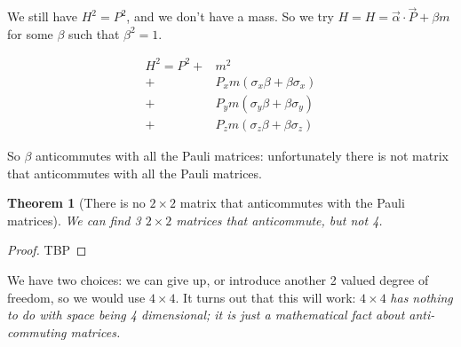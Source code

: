 \documentclass[]{article}
\newtheorem{thm}{Theorem}
\begin{document}
We still have $H^2=P^2$, and we don't have a mass. So we try $H= H = \vec{\alpha} \cdot \vec{P}+\beta m$ for some $\beta$ such that $\beta^2=1$.

\begin{align*}
	H^2 = P^2 +& m^2 \\
	+& P_x m (\sigma_x \beta + \beta \sigma_x) \\
	+& P_y m (\sigma_y \beta + \beta \sigma_y) \\
	+& P_z m (\sigma_z \beta + \beta \sigma_z)
\end{align*}

So $\beta$ anticommutes with all the Pauli matrices: unfortunately there is not matrix that anticommutes with all the Pauli matrices.

\begin{thm}[There is no $2 \times 2$ matrix that anticommutes with the Pauli matrices]
	We can find 3 $2 \times 2$ matrices that anticommute, but not 4.
\end{thm}
\begin{proof}
	TBP
\end{proof}
We have two choices: we can give up, or introduce another 2 valued degree of freedom, so we would use $4 \times 4$. It turns out that this will work: $4 \times 4$ \emph{has nothing to do with space being 4 dimensional; it is just a mathematical fact about anti-commuting matrices.} 
\end{document}
